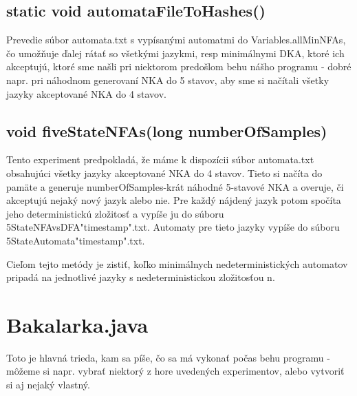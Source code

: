 \subsection*{static void automataFileToHashes()}
Prevedie súbor automata.txt s vypísanými automatmi do Variables.allMinNFAs, čo umožňuje ďalej rátať so všetkými jazykmi, resp minimálnymi DKA, ktoré ich akceptujú, ktoré sme našli pri niektorom predošlom behu nášho programu - dobré napr. pri náhodnom generovaní NKA do 5 stavov, aby sme si načítali všetky jazyky akceptované NKA do 4 stavov.

\subsection*{void fiveStateNFAs(long numberOfSamples)}
Tento experiment predpokladá, že máme k dispozícii súbor automata.txt obsahujúci všetky jazyky akceptované NKA do 4 stavov. Tieto si načíta do pamäte a generuje numberOfSamples-krát náhodné 5-stavové NKA a overuje, či akceptujú nejaký nový jazyk alebo nie. Pre každý nájdený jazyk potom spočíta jeho deterministickú zložitosť a vypíše ju do súboru 5StateNFAvsDFA"timestamp".txt. Automaty pre tieto jazyky vypíše do súboru 5StateAutomata"timestamp".txt. 

Cieľom tejto metódy je zistiť, koľko minimálnych nedeterministických automatov pripadá na jednotlivé jazyky s nedeterministickou zložitosťou n.

\section{Bakalarka.java}
Toto je hlavná trieda, kam sa píše, čo sa má vykonať počas behu programu - môžeme si napr. vybrať niektorý z hore uvedených experimentov, alebo vytvoriť si aj nejaký vlastný.
